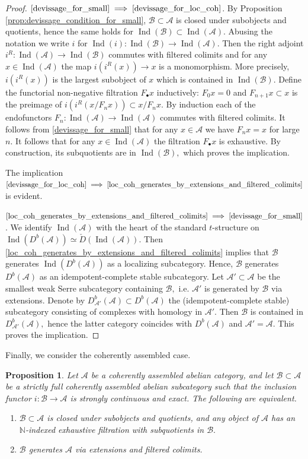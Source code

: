 \documentclass[11pt,leqno]{amsart}
\newcommand{\Implies}[2]{$\text{\ref{#1}}\implies\text{\ref{#2}}$}
\newtheorem{prop}[theo]{Proposition}
\numberwithin{equation}{section}
\def\N{\mathbb{N}}
\newcommand{\cA}{{\mathcal A}}
\newcommand{\cB}{{\mathcal B}}
\newcommand{\Ind}{\operatorname{Ind}}
\begin{document}
\begin{proof}
\Implies{devissage_for_small}{devissage_for_loc_coh}. By Proposition \ref{prop:devissage_condition_for_small}, $\cB\subset\cA$ is closed under subobjects and quotients, hence the same holds for $\Ind(\cB)\subset\Ind(\cA).$ Abusing the notation we write $i$ for $\Ind(i):\Ind(\cB)\to\Ind(\cA).$ Then the right adjoint $i^R:\Ind(\cA)\to\Ind(\cB)$ commutes with filtered colimits and for any $x\in\Ind(\cA)$ the map $i(i^R(x))\to x$ is a monomorphism. More precisely, $i(i^R(x))$ is the largest subobject of $x$ which is contained in $\Ind(\cB).$ Define the functorial non-negative filtration $F_{\bullet}x$ inductively: $F_0 x=0$ and $F_{n+1}x\subset x$ is the preimage of $i(i^R(x/F_n x))\subset x/F_n x.$ By induction each of the endofunctors $F_n:\Ind(\cA)\to\Ind(\cA)$ commutes with filtered colimits. It follows from \ref{devissage_for_small} that for any $x\in\cA$ we have $F_n x=x$ for large $n.$ It follows that for any $x\in\Ind(\cA)$ the filtration $F_{\bullet}x$ is exhaustive. By construction, its subquotients are in $\Ind(\cB),$ which proves the implication.

The implication \Implies{devissage_for_loc_coh}{loc_coh_generates_by_extensions_and_filtered_colimits} is evident.

\Implies{loc_coh_generates_by_extensions_and_filtered_colimits}{devissage_for_small}. We identify $\Ind(\cA)$ with the heart of the standard $t$-structure on $\Ind(D^b(\cA))\simeq \check{D}(\Ind(\cA)).$ Then \ref{loc_coh_generates_by_extensions_and_filtered_colimits} implies that $\cB$ generates $\Ind(D^b(\cA))$ as a localizing subcategory. Hence, $\cB$ generates $D^b(\cA)$ as an idempotent-complete stable subcategory. Let $\cA'\subset\cA$ be the smallest weak Serre subcategory containing $\cB,$ i.e. $\cA'$ is generated by $\cB$ via extensions. Denote by $D^b_{\cA'}(\cA)\subset D^b(\cA)$ the (idempotent-complete stable) subcategory consisting of complexes with homology in $\cA'.$ Then $\cB$ is contained in $D^b_{\cA'}(\cA),$ hence the latter category coincides with $D^b(\cA)$ and $\cA'=\cA.$ This proves the implication.
\end{proof}

Finally, we consider the coherently assembled case.

\begin{prop}\label{prop:devissage_condition_for_coherently_assembled}
Let $\cA$ be a coherently assembled abelian category, and let $\cB\subset\cA$ be a strictly full coherently assembled abelian subcategory such that the inclusion functor $i:\cB\to\cA$ is strongly continuous and exact. The following are equivalent.
\begin{enumerate}[label=(\roman*),ref=(\roman*)]
	\item $\cB\subset\cA$ is closed under subobjects and quotients, and any object of $\cA$ has an $\N$-indexed exhaustive filtration with subquotients in $\cB.$ \label{devissage_for_coh_ass}
	\item $\cB$ generates $\cA$ via extensions and filtered colimits. \label{coh_ass_generates_by_extensions_and_filtered_colimits}
\end{enumerate}
\end{prop}
\end{document}

